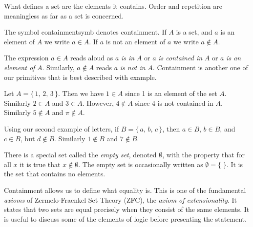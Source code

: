         What defines a set are the elements it contains. Order and repetition
        are meaningless as far as a set is concerned.
        \begin{notation}
            The symbol \gls{containmentsymb} denotes containment.
            If $A$ is a set, and $a$ is an element of $A$ we write
            $a\in{A}$. If $a$ is not an element of $a$ we write $a\notin{A}$.
        \end{notation}
        The expression $a\in{A}$ reads aloud as $a$ \textit{is in} $A$ or
        $a$ \textit{is contained in} $A$ or $a$ \textit{is an element of} $A$.
        Similarly, $a\notin{A}$ reads $a$ \textit{is not in} $A$. Containment is
        another one of our primitives that is best described with example.
        \begin{example}
            Let $A=\{\,1,\,2,\,3\,\}$. Then we have $1\in{A}$ since 1 is an
            element of the set $A$. Similarly $2\in{A}$ and $3\in{A}$. However,
            $4\notin{A}$ since 4 is not contained in $A$. Similarly
            $5\notin{A}$ and $\pi\notin{A}$.
        \end{example}
        \begin{example}
            Using our second example of letters, if $B=\{\,a,\,b,\,c\,\}$, then
            $a\in{B}$, $b\in{B}$, and $c\in{B}$, but $d\notin{B}$. Similarly
            $1\notin{B}$ and $7\notin{B}$.
        \end{example}
        There is a special set called the \textit{empty set}, denoted
        $\emptyset$, with the property that for all $x$ it is true that
        $x\notin\emptyset$. The empty set is occasionally written as
        $\emptyset=\{\;\}$. It is the set that contains no elements.
        \par\hfill\par
        Containment allows us to define what equality is. This is one of the
        fundamental \textit{axioms} of Zermelo-Fraenkel Set Theory (ZFC), the
        \textit{axiom of extensionality}. It states that two sets are equal
        precisely when they consist of the same elements. It is useful to
        discuss some of the elements of logic before presenting the statement.
